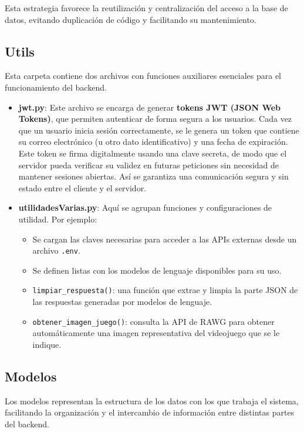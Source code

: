 Esta estrategia favorece la reutilización y centralización del acceso a la base de datos, evitando duplicación de código y facilitando su mantenimiento.


\subsection{Utils}

Esta carpeta contiene dos archivos con funciones auxiliares esenciales para el funcionamiento del backend.

\begin{itemize}
	\item \textbf{jwt.py}: Este archivo se encarga de generar \textbf{tokens JWT (JSON Web Tokens)}, que permiten autenticar de forma segura a los usuarios. Cada vez que un usuario inicia sesión correctamente, se le genera un token que contiene su correo electrónico (u otro dato identificativo) y una fecha de expiración. Este token se firma digitalmente usando una clave secreta, de modo que el servidor pueda verificar su validez en futuras peticiones sin necesidad de mantener sesiones abiertas. Así se garantiza una comunicación segura y sin estado entre el cliente y el servidor.
	
	\item \textbf{utilidadesVarias.py}: Aquí se agrupan funciones y configuraciones de utilidad. Por ejemplo:
	\begin{itemize}
		\item Se cargan las claves necesarias para acceder a las APIs externas desde un archivo \texttt{.env}.
		\item Se definen listas con los modelos de lenguaje disponibles para su uso.
		\item \texttt{limpiar\_respuesta()}: una función que extrae y limpia la parte JSON de las respuestas generadas por modelos de lenguaje.
		\item \texttt{obtener\_imagen\_juego()}: consulta la API de RAWG para obtener automáticamente una imagen representativa del videojuego que se le indique.
	\end{itemize}
\end{itemize}


\subsection{Modelos}

Los modelos representan la estructura de los datos con los que trabaja el sistema, facilitando la organización y el intercambio de información entre distintas partes del backend.

